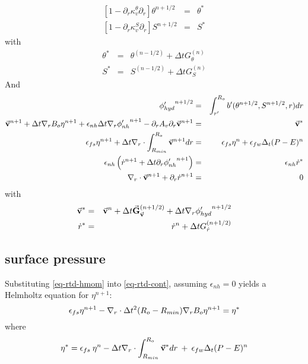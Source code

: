 \begin{eqnarray*}
\left[ 1 - \partial_r \kappa_v^\theta \partial_r \right]
\theta^{n+1/2} & = & \theta^*
\\
\left[ 1 - \partial_r \kappa_v^S \partial_r \right]
S^{n+1/2} & = & S^*
\end{eqnarray*}
with
\begin{eqnarray*}
\theta^* & = &
\theta ^{(n-1/2)} + \Delta t G_{\theta} ^{(n)}
\\
S^* & = &
S ^{(n-1/2)} + \Delta t G_{S} ^{(n)}
\end{eqnarray*}
And 
\begin{eqnarray*}
{\phi'_{hyd}}^{n+1/2} & = & \int_{r'}^{R_o} b'(\theta^{n+1/2},S^{n+1/2},r) dr
\\
\vec{\bf v} ^{n+1}
+ \Delta t {\bf \nabla}_r B_o {\eta}^{n+1}
+ \epsilon_{nh} \Delta t {\bf \nabla}_r {\phi'_{nh}}^{n+1}
- \partial_r A_v \partial_r \vec{\bf v}^{n+1}
& = &
\vec{\bf v}^*
\\
\epsilon_{fs} {\eta}^{n+1} + \Delta t
{\bf \nabla}_r \cdot \int_{R_{min}}^{R_o} \vec{\bf v}^{n+1} dr
& = & 
\epsilon_{fs} {\eta}^{n} + \epsilon_{fw} \Delta_t (P-E)^{n} 
\\
\epsilon_{nh} \left( \dot{r} ^{n+1}
+ \Delta t \partial_r {\phi'_{nh}} ^{n+1}
\right)
& = & \epsilon_{nh} \dot{r}^*
\\
{\bf \nabla}_r \cdot \vec{\bf v}^{n+1} + \partial_r \dot{r}^{n+1}
& = & 0
\end{eqnarray*}
with
\begin{eqnarray*}
\vec{\bf v}^* & = &
\vec{\bf v} ^{n} + \Delta t \vec{\bf G}_{\vec{\bf v}} ^{(n+1/2)}
+ \Delta t  {\bf \nabla}_r {\phi'_{hyd}}^{n+1/2}
\\
\dot{r}^* & = &
\dot{r} ^{n} + \Delta t G_{\dot{r}} ^{(n+1/2)}
\end{eqnarray*}


\subsection{surface pressure}

Substituting \ref{eq-rtd-hmom} into \ref{eq-rtd-cont}, assuming
$\epsilon_{nh} = 0$ yields a Helmholtz equation for ${\eta}^{n+1}$:
$$
\epsilon_{fs} {\eta}^{n+1} -
{\bf \nabla}_r \cdot \Delta t^2 (R_o-R_{min})
{\bf \nabla}_r B_o {\eta}^{n+1}
= {\eta}^*
\label{solve_2d}
$$ 
where
$$
{\eta}^* = \epsilon_{fs} \: {\eta}^{n} -
\Delta t {\bf \nabla}_r \cdot \int_{R_{min}}^{R_o} \vec{\bf v}^* dr
\: + \: \epsilon_{fw} \Delta_t (P-E)^{n} 
$$

